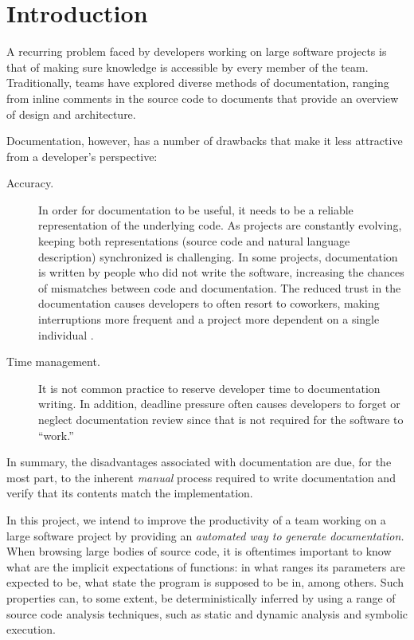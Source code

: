 \section{Introduction}

A recurring problem faced by developers working on large software projects is
that of making sure knowledge is accessible by every member of the team.
Traditionally, teams have explored diverse methods of documentation, ranging
from inline comments in the source code to documents that provide an overview
of design and architecture.

Documentation, however, has a number of drawbacks that make it less attractive
from a developer's perspective:

\begin{description}
  \item[Accuracy.] In order for documentation to be useful,
    it needs to be a reliable representation of the underlying code. As
    projects are constantly evolving, keeping both representations (source code
    and natural language description) synchronized is challenging. In some
    projects, documentation is written by people who did not write the
    software, increasing the chances of mismatches between code and
    documentation. The reduced trust in the documentation causes developers
    to often resort to coworkers, making interruptions more frequent
    and a project more dependent on a single individual \cite{Ko:2007}.

  \item[Time management.] It is not common practice to reserve developer time
    to documentation writing. In addition, deadline pressure often causes
    developers to forget or neglect documentation review since that is not
    required for the software to ``work.''
\end{description}

In summary, the disadvantages associated with documentation are due, for the
most part, to the inherent \emph{manual} process required to write
documentation and verify that its contents match the implementation.

In this project, we intend to improve the productivity of a team working on a
large software project by providing an \emph{automated way to generate
documentation.} When browsing large bodies of source code, it is oftentimes
important to know what are the implicit expectations of functions: in what
ranges its parameters are expected to be, what state the program is
supposed to be in, among others. Such properties can, to some extent, be
deterministically inferred by using a range of source code analysis techniques,
such as static and dynamic analysis and symbolic execution.
